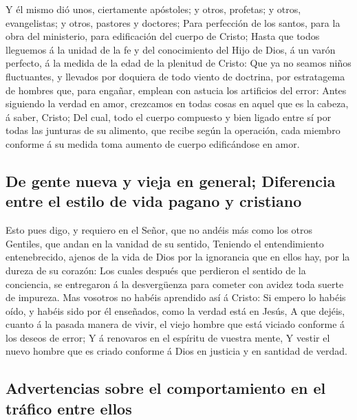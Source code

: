  Y él mismo dió unos, ciertamente apóstoles; y otros,
profetas; y otros, evangelistas; y otros, pastores y doctores;
 Para perfección de los santos, para la obra del
ministerio, para edificación del cuerpo de Cristo;  Hasta
que todos lleguemos á la unidad de la fe y del conocimiento del Hijo de
Dios, á un varón perfecto, á la medida de la edad de la plenitud de
Cristo:  Que ya no seamos niños fluctuantes, y llevados por
doquiera de todo viento de doctrina, por estratagema de hombres que,
para engañar, emplean con astucia los artificios del error:
 Antes siguiendo la verdad en amor, crezcamos en todas
cosas en aquel que es la cabeza, á saber, Cristo;  Del
cual, todo el cuerpo compuesto y bien ligado entre sí por todas las
junturas de su alimento, que recibe según la operación, cada miembro
conforme á su medida toma aumento de cuerpo edificándose en amor.

\hypertarget{de-gente-nueva-y-vieja-en-general-diferencia-entre-el-estilo-de-vida-pagano-y-cristiano}{%
\subsection{De gente nueva y vieja en general; Diferencia entre el
estilo de vida pagano y
cristiano}\label{de-gente-nueva-y-vieja-en-general-diferencia-entre-el-estilo-de-vida-pagano-y-cristiano}}

 Esto pues digo, y requiero en el Señor, que no andéis más
como los otros Gentiles, que andan en la vanidad de su sentido,
 Teniendo el entendimiento entenebrecido, ajenos de la vida
de Dios por la ignorancia que en ellos hay, por la dureza de su corazón:
 Los cuales después que perdieron el sentido de la
conciencia, se entregaron á la desvergüenza para cometer con avidez toda
suerte de impureza.  Mas vosotros no habéis aprendido así á
Cristo:  Si empero lo habéis oído, y habéis sido por él
enseñados, como la verdad está en Jesús,  A que dejéis,
cuanto á la pasada manera de vivir, el viejo hombre que está viciado
conforme á los deseos de error;  Y á renovaros en el
espíritu de vuestra mente,  Y vestir el nuevo hombre que es
criado conforme á Dios en justicia y en santidad de verdad.

\hypertarget{advertencias-sobre-el-comportamiento-en-el-truxe1fico-entre-ellos}{%
\subsection{Advertencias sobre el comportamiento en el tráfico entre
ellos}\label{advertencias-sobre-el-comportamiento-en-el-truxe1fico-entre-ellos}}

